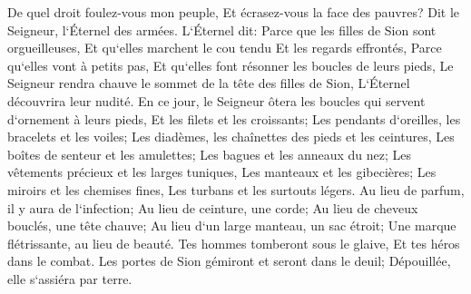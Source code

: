 \verse De quel droit foulez-vous mon peuple, Et écrasez-vous la face des pauvres? Dit le Seigneur, l`Éternel des armées. 
\verse L`Éternel dit: Parce que les filles de Sion sont orgueilleuses, Et qu`elles marchent le cou tendu Et les regards effrontés, Parce qu`elles vont à petits pas, Et qu`elles font résonner les boucles de leurs pieds, 
\verse Le Seigneur rendra chauve le sommet de la tête des filles de Sion, L`Éternel découvrira leur nudité. 
\verse En ce jour, le Seigneur ôtera les boucles qui servent d`ornement à leurs pieds, Et les filets et les croissants; 
\verse Les pendants d`oreilles, les bracelets et les voiles; 
\verse Les diadèmes, les chaînettes des pieds et les ceintures, Les boîtes de senteur et les amulettes; 
\verse Les bagues et les anneaux du nez; 
\verse Les vêtements précieux et les larges tuniques, Les manteaux et les gibecières; 
\verse Les miroirs et les chemises fines, Les turbans et les surtouts légers. 
\verse Au lieu de parfum, il y aura de l`infection; Au lieu de ceinture, une corde; Au lieu de cheveux bouclés, une tête chauve; Au lieu d`un large manteau, un sac étroit; Une marque flétrissante, au lieu de beauté. 
\verse Tes hommes tomberont sous le glaive, Et tes héros dans le combat. 
\verse Les portes de Sion gémiront et seront dans le deuil; Dépouillée, elle s`assiéra par terre. 

